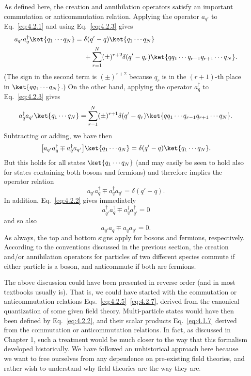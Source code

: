 As defined here, the creation and annihilation operators satisfy an important
commutation or anticommutation relation. Applying the operator
$a_{q'}$ to Eq.~\eqref{eq:4.2.1} and using Eq.~\eqref{eq:4.2.3} gives
\begin{align*}
  a_{q'}a^\dagger_q\ket{q_1\cdots q_N}
  ={}& \delta(q'-q)\ket{q_1\cdots q_N}
  \\
  &+\sum_{r=1}^{N}(\pm)^{r+2}\delta(q'-q_r)
    \ket{q q_1\cdots q_{r-1}q_{r+1}\cdots q_N}.
\end{align*}
(The sign in the second term is $(\pm)^{r+2}$ because $q_r$ is in the $(r+1)$-th place
in $\ket{q q_1\cdots q_N}$.) On the other hand, applying the operator $a^\dagger_q$ to Eq.~\eqref{eq:4.2.3}
gives
\[
  a^\dagger_q a_{q'}\ket{q_1\cdots q_N}
  =\sum_{r=1}^{N}(\pm)^{r+1}\delta(q'-q_r)
  \ket{q q_1\cdots q_{r-1}q_{r+1}\cdots q_N}.
\]
Subtracting or adding, we have then
\[
  \bigl[a_{q'}a^\dagger_q\mp a^\dagger_q a_{q'}\bigr]\ket{q_1\cdots q_N}
  =\delta(q'-q)\ket{q_1\cdots q_N}.
\]
But this holds for all states $\ket{q_1\cdots q_N}$ (and may easily be seen to hold also
for states containing both bosons and fermions) and therefore implies the
operator relation
\begin{equation}
  a_{q'}a^\dagger_q\mp a^\dagger_q a_{q'}=\delta(q'-q).
  \tag{4.2.5}
  \label{eq:4.2.5}
\end{equation}
In addition, Eq.~\eqref{eq:4.2.2} gives immediately
\begin{equation}
  a^\dagger_{q'}a^\dagger_q\mp a^\dagger_q a^\dagger_{q'}=0
  \tag{4.2.6}
  \label{eq:4.2.6}
\end{equation}
and so also
\begin{equation}
  a_{q'}a_q\mp a_q a_{q'}=0.
  \tag{4.2.7}
  \label{eq:4.2.7}
\end{equation}
As always, the top and bottom signs apply for bosons and fermions,
respectively. According to the conventions discussed in the previous
section, the creation and/or annihilation operators for particles of two
different species commute if either particle is a boson, and anticommute
if both are fermions.

The above discussion could have been presented in reverse order (and
in most textbooks usually is). That is, we could have started with the
commutation or anticommutation relations Eqs.~\eqref{eq:4.2.5}--\eqref{eq:4.2.7}, derived
from the canonical quantization of some given field theory. Multi-particle
states would have then been defined by Eq.~\eqref{eq:4.2.2}, and their scalar
products Eq.~\eqref{eq:4.1.7} derived from the commutation or anticommutation
relations. In fact, as discussed in Chapter 1, such a treatment would be
much closer to the way that this formalism developed historically. We
have followed an unhistorical approach here because we want to free
ourselves from any dependence on pre-existing field theories, and rather
wish to understand why field theories are the way they are.

